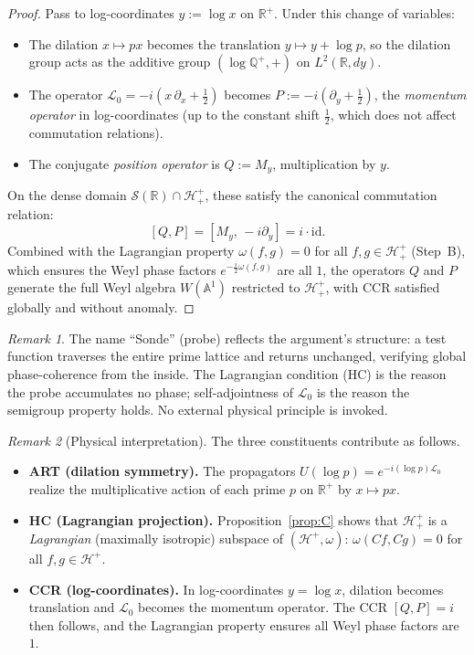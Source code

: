\documentclass[12pt,a4paper]{article}
\theoremstyle{remark}
\newtheorem*{remark}{Remark}
\begin{document}
\begin{proof}
Pass to log-coordinates $y:=\log x$ on $\mathbb{R}^+$.
Under this change of variables:
\begin{itemize}
\item The dilation $x\mapsto px$ becomes the translation
  $y\mapsto y+\log p$, so the dilation group acts as the
  additive group $(\log\mathbb{Q}^+,+)$ on $L^2(\mathbb{R},dy)$.
\item The operator $\mathcal{L}_0=-i(x\,\partial_x+\tfrac{1}{2})$
  becomes $P:=-i(\partial_y+\tfrac{1}{2})$, the \emph{momentum operator}
  in log-coordinates (up to the constant shift $\tfrac{1}{2}$, which
  does not affect commutation relations).
\item The conjugate \emph{position operator} is $Q:=M_y$,
  multiplication by $y$.
\end{itemize}
On the dense domain $\mathcal{S}(\mathbb{R})\cap\mathcal{H}^+_+$,
these satisfy the canonical commutation relation:
\[
  [Q,P] = [M_y,\,-i\partial_y] = i\cdot\mathrm{id}.
\]
Combined with the Lagrangian property $\omega(f,g)=0$ for all
$f,g\in\mathcal{H}^+_+$ (Step~B), which ensures the Weyl phase factors
$e^{-\frac{i}{2}\omega(f,g)}$ are all $1$, the operators $Q$ and $P$
generate the full Weyl algebra $W(\mathbb{A}^1)$ restricted to
$\mathcal{H}^+_+$, with CCR satisfied globally and without anomaly.
\end{proof}

\begin{remark}
The name ``Sonde'' (probe) reflects the argument's structure: a test
function traverses the entire prime lattice and returns unchanged,
verifying global phase-coherence from the inside.  The Lagrangian
condition (HC) is the reason the probe accumulates no phase;
self-adjointness of $\mathcal{L}_0$ is the reason the semigroup
property holds.  No external physical principle is invoked.
\end{remark}

\begin{remark}[Physical interpretation]
The three constituents contribute as follows.
\begin{itemize}
\item \textbf{ART (dilation symmetry).}
The propagators $U(\log p)=e^{-i(\log p)\mathcal{L}_0}$ realize the
multiplicative action of each prime $p$ on $\mathbb{R}^+$ by
$x\mapsto px$.

\item \textbf{HC (Lagrangian projection).}
Proposition~\ref{prop:C} shows that $\mathcal{H}^+_+$ is a
\emph{Lagrangian} (maximally isotropic) subspace of
$(\mathcal{H}^+, \omega)$: $\omega(Cf,Cg)=0$ for all
$f,g\in\mathcal{H}^+$.

\item \textbf{CCR (log-coordinates).}
In log-coordinates $y=\log x$, dilation becomes translation and
$\mathcal{L}_0$ becomes the momentum operator.
The CCR $[Q,P]=i$ then follows, and the Lagrangian property
ensures all Weyl phase factors are $1$.
\end{itemize}
\end{remark}
\end{document}
